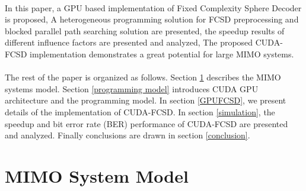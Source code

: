 \documentclass[12pt,a4paper,final]{article}
\begin{document}
\begin{spacing}{2.5}
\paragraph{}In this paper, a GPU based implementation of Fixed Complexity Sphere Decoder is proposed, A heterogeneous programming solution for FCSD preprocessing and blocked parallel path searching solution are presented, the speedup results of different influence factors are presented and analyzed, The proposed CUDA-FCSD implementation demonstrates a great potential for large MIMO systems.
\paragraph{}The rest of the paper is organized as follows. Section \ref{system} describes the MIMO systems model. Section \ref{programming model} introduces CUDA GPU architecture and the programming model. In section \ref{GPUFCSD}, we present details of the implementation of CUDA-FCSD. In section \ref{simulation}, the speedup and bit error rate (BER) performance of CUDA-FCSD are presented and analyzed. Finally conclusions are drawn in section \ref{conclusion}.    
\section{MIMO System Model}\label{system}

\end{spacing}
\end{document}

